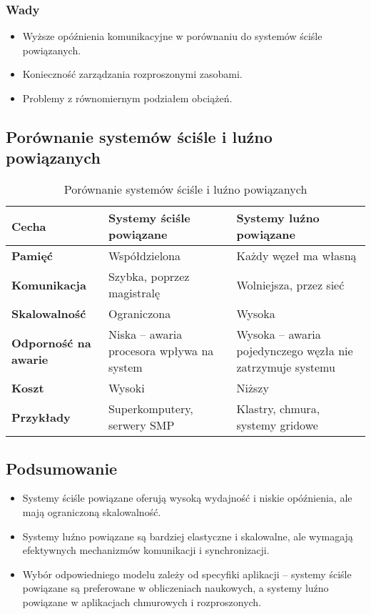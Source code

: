 \subsubsection{Wady}
\begin{itemize}
    \item Wyższe opóźnienia komunikacyjne w porównaniu do systemów ściśle powiązanych.
    \item Konieczność zarządzania rozproszonymi zasobami.
    \item Problemy z równomiernym podziałem obciążeń.
\end{itemize}

\subsection{Porównanie systemów ściśle i luźno powiązanych}

 \begin{table}[h]
    \centering
    \renewcommand{\arraystretch}{1.3} %
    \begin{tabularx}{\textwidth}{|l|X|X|}
        \hline
        \textbf{Cecha} & \textbf{Systemy ściśle powiązane} & \textbf{Systemy luźno powiązane} \\
        \hline
        \textbf{Pamięć} & Współdzielona & Każdy węzeł ma własną \\
        \hline
        \textbf{Komunikacja} & Szybka, poprzez magistralę & Wolniejsza, przez sieć \\
        \hline
        \textbf{Skalowalność} & Ograniczona & Wysoka \\
        \hline
        \textbf{Odporność na awarie} & Niska – awaria procesora wpływa na system & Wysoka – awaria pojedynczego węzła nie zatrzymuje systemu \\
        \hline
        \textbf{Koszt} & Wysoki & Niższy \\
        \hline
        \textbf{Przykłady} & Superkomputery, serwery SMP & Klastry, chmura, systemy gridowe \\
        \hline
    \end{tabularx}
    \caption{Porównanie systemów ściśle i luźno powiązanych}
 \end{table}


\subsection{Podsumowanie}
\begin{itemize}
    \item Systemy ściśle powiązane oferują wysoką wydajność i niskie opóźnienia, ale mają ograniczoną skalowalność.
    \item Systemy luźno powiązane są bardziej elastyczne i skalowalne, ale wymagają efektywnych mechanizmów komunikacji i synchronizacji.
    \item Wybór odpowiedniego modelu zależy od specyfiki aplikacji – systemy ściśle powiązane są preferowane w obliczeniach naukowych, a systemy luźno powiązane w aplikacjach chmurowych i rozproszonych.
\end{itemize}
